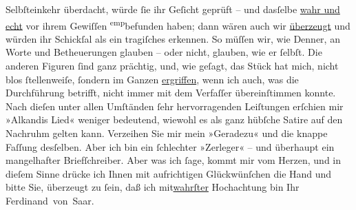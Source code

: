 \begin{ledgroupsized}[t]{13cm}
                    Selbſteinkehr überdacht, würde ſie ihr Geſicht geprüft – und dasſelbe \uline{wahr und echt} vor ihrem Gewiſſen \substVorne{}\textsuperscript{emp}\substDazwischen{}be\substHinten{}funden haben; dann wären auch wir \uline{überzeugt} und würden ihr Schickſal als ein tragiſches erkennen. So
                    müſſen wir, wie Denner, an
                    Worte und Betheuerungen glauben – oder nicht, glauben, wie er ſelbſt. Die
                    anderen Figuren ſind ganz prächtig, und, wie geſagt, das Stück hat mich, nicht blos ſtellenweiſe,
                    ſondern im Ganzen \uline{ergriffen}, wenn ich auch, was
                    die Durchführung betrifft, nicht immer mit dem Verfaſſer übereinſtimmen konnte.
                    Nach dieſen unter allen Umſtänden ſehr hervorragenden Leiſtungen erſchien mir
                        »Alkandis Lied« weniger bedeutend, wiewohl
                    es als ganz hübſche Satire auf den Nachruhm gelten kann.\pend
           \pstart
           Verzeihen Sie mir mein »Geradezu« und die knappe Faſſung desſelben. Aber ich bin
                        {\pb}ein ſchlechter »Zerleger« – und überhaupt
                    ein mangelhafter Briefſchreiber. Aber was ich ſage, kommt mir vom Herzen, und in
                    dieſem Sinne drücke ich Ihnen mit aufrichtigen Glückwünſchen die Hand und bitte
                    Sie, überzeugt zu ſein, daß ich \introOben{}mit\introOben{}{ }\uline{wahrſter} Hochachtung bin\pend
           \pstart Ihr \spacefill\mbox{Ferdinand von Saar.}\pend{}\endnumbering{}\end{ledgroupsized}  \newcommand{\dateiname}{L00296}\newcommand{\titel}{Ferdinand von Saar an Arthur Schnitzler, 5. 2. 1894}\newcommand{\editorInnen}{Martin Anton Müller und Gerd-Hermann Susen}
      